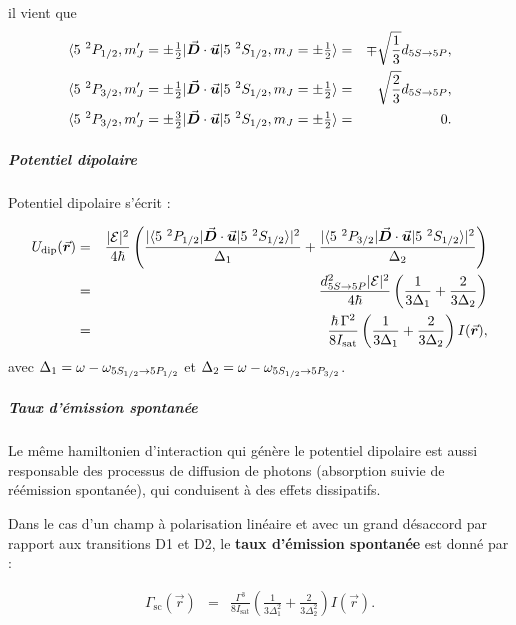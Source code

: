 il vient que 
\begin{eqnarray*}
	\langle 5 {~}^2P_{1/2} , m_J' = \pm\tfrac12 \vert \vec{{\bm{D}}} \cdot \vec{{\bm{u}}}\vert 5 {~}^2S_{1/2} , m_J = \pm  \tfrac12 \rangle	 &=& \mp  \sqrt{\frac{1}{3}} d_{\scriptstyle 5S \rightarrow 5P},\\
	\langle 5 {~}^2P_{3/2} , m_J' = \pm \tfrac12 \vert \vec{{\bm{D}}} \cdot \vec{{\bm{u}}}\vert 5 {~}^2S_{1/2} , m_J = \pm  \tfrac12 \rangle	 &=& \sqrt{\frac{2}{3}} d_{\scriptstyle 5S \rightarrow 5P} , \\
	\langle 5 {~}^2P_{3/2} , m_J' = \pm \tfrac32 \vert \vec{{\bm{D}}} \cdot \vec{{\bm{u}}}\vert 5 {~}^2S_{1/2} , m_J = \pm  \tfrac12 \rangle & = & 0 .
\end{eqnarray*}


\subparagraph{Potentiel dipolaire}

Potentiel dipolaire s'écrit :

\begin{eqnarray*}
	U_{\mathrm{dip}}(\operatorvec{r}) &  = & \frac{ \vert \mathcal{E} \vert^2}{4 \hbar} \left( \frac{ \vert \langle 5 {~}^2P_{1/2}  \vert \operatorvec{D} \cdot \operatorvec{u}\vert 5 {~}^2S_{1/2}  \rangle \vert^2}{ \Delta_1} + \frac{ \vert\langle 5 {~}^2P_{3/2}  \vert \operatorvec{D} \cdot \operatorvec{u}\vert 5 {~}^2S_{1/2}  \rangle \vert^2}{ \Delta_2}  \right )\\ & = &  \frac{  d_{\scriptstyle 5S \rightarrow 5P}^2 \vert \mathcal{E} \vert^2 }{4 \hbar} \left( \frac{ 1}{ 3 \Delta_1} + \frac{2 }{ 3 \Delta_2}  \right ) \\&=& \frac{\hbar \, \Gamma^2}{8 I_{\mathrm{sat}}} \left( \frac{ 1}{ 3 \Delta_1} + \frac{2 }{ 3 \Delta_2}  \right ) I(\operatorvec{r}) ,		
\end{eqnarray*}
avec $\Delta_1 = \omega -\omega_{\tiny 5S_{1/2} \rightarrow 5P_{1/2}} $ et $\Delta_2 = \omega -\omega_{\tiny 5S_{1/2} \rightarrow 5P_{3/2}} $.

\subparagraph{Taux d’émission spontanée}
Le même hamiltonien d’interaction qui génère le potentiel dipolaire est aussi responsable des processus de diffusion de photons (absorption suivie de réémission spontanée), qui conduisent à des effets dissipatifs.

Dans le cas d’un champ à polarisation linéaire et avec un grand désaccord par rapport aux transitions D1 et D2, le {\bf taux d’émission spontanée} est donné par :

\begin{eqnarray}
\Gamma_{\mathrm{sc}}(\vec{r}) & = & \frac{\Gamma^3}{8 I_{\mathrm{sat}}} \left( \frac{1}{3 \Delta_1^2} + \frac{2}{3 \Delta_2^2} \right) I(\vec{r}) .
\label{eq:scattering_rate}
\end{eqnarray}

